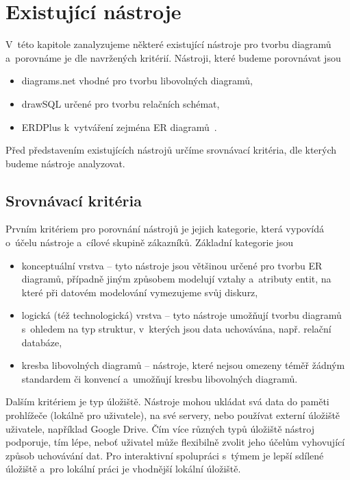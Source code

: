 \chapter{Existující nástroje}

V~této kapitole zanalyzujeme některé existující nástroje pro tvorbu diagramů
a~porovnáme je dle navržených kritérií. Nástroji, které budeme porovnávat jsou
\begin{itemize}
  \item diagrams.net vhodné pro tvorbu libovolných diagramů,
  \item drawSQL určené pro tvorbu relačních schémat,
  \item ERDPlus k~vytváření zejména ER diagramů~\cite{Chen76}.
\end{itemize}

Před představením existujících nástrojů určíme srovnávací kritéria, dle kterých
budeme nástroje analyzovat.

\section{Srovnávací kritéria}

Prvním kritériem pro porovnání nástrojů je jejich kategorie, která vypovídá
o~účelu nástroje a~cílové skupině zákazníků. Základní kategorie jsou
\begin{itemize}
  \item konceptuální vrstva -- tyto nástroje jsou většinou určené pro tvorbu ER
  diagramů, případně jiným způsobem modelují vztahy a~atributy entit, na které
  při datovém modelování vymezujeme svůj diskurz,
  \item logická (též technologická) vrstva -- tyto nástroje umožňují tvorbu
  diagramů s~ohledem na typ struktur, v~kterých jsou data uchovávána, např.
  relační databáze,
  \item kresba libovolných diagramů -- nástroje, které nejsou omezeny téměř
  žádným standardem či konvencí a~umožňují kresbu libovolných diagramů.
\end{itemize}

Dalším kritériem je typ úložiště. Nástroje mohou ukládat svá data do paměti
prohlížeče (lokálně pro uživatele), na své servery, nebo používat externí
úložiště uživatele, například Google Drive. Čím více různých typů úložiště
nástroj podporuje, tím lépe, neboť uživatel může flexibilně zvolit jeho účelům
vyhovující způsob uchovávání dat. Pro interaktivní spolupráci s~týmem je lepší sdílené
úložiště a~pro lokální práci je vhodnější lokální úložiště.

